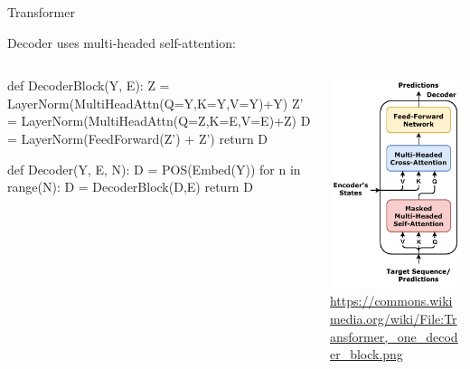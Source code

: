 \documentclass[ignorenonframetext,xcolor=x11names]{beamer}
\begin{document}
\begin{frame}[fragile]{Transformer}

Decoder uses multi-headed self-attention:

\begin{columns}
\begin{column}{.75\textwidth}
\begin{textcode}
def DecoderBlock(Y, E):
  Z = LayerNorm(MultiHeadAttn(Q=Y,K=Y,V=Y)+Y)
  Z' = LayerNorm(MultiHeadAttn(Q=Z,K=E,V=E)+Z)
  D = LayerNorm(FeedForward(Z') + Z')
  return D
\end{textcode}

\begin{textcode}
def Decoder(Y, E, N):
  D = POS(Embed(Y))
  for n in range(N):
    D = DecoderBlock(D,E)
  return D
\end{textcode}
\end{column}
\begin{column}{.3\textwidth}
\includegraphics[width=\textwidth]{Transformer,_one_decoder_block.png} \\

\tiny \url{https://commons.wikimedia.org/wiki/File:Transformer,_one_decoder_block.png}
\end{column}
\end{columns}
\end{frame}
\end{document}
